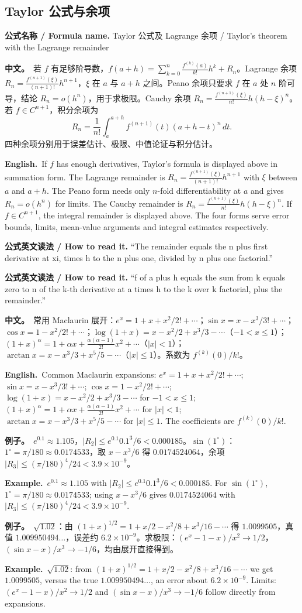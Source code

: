 \documentclass[UTF8,11pt,a4paper]{ctexart}
\newcommand{\BOTH}[2]{\par\noindent\textbf{中文。}\ #1\par\noindent\textbf{English.}\ #2\par}
\newcommand{\EX}[2]{\par\noindent\textbf{例子。}\ #1\par\noindent\textbf{Example.}\ #2\par}
\newcommand{\READ}[1]{\par\noindent\textbf{公式英文读法 / How to read it.} #1\par}
\newcommand{\FORMULA}[2]{\par\noindent\textbf{公式名称 / Formula name.} #1 / #2\par}
\begin{document}
\subsection{Taylor 公式与余项}
\FORMULA{Taylor 公式及 Lagrange 余项}{Taylor's theorem with the Lagrange remainder}
\BOTH{若 $f$ 有足够阶导数，$f(a+h)=\sum_{k=0}^n\frac{f^{(k)}(a)}{k!}h^k+R_n$。Lagrange 余项 $R_n=\frac{f^{(n+1)}(\xi)}{(n+1)!}h^{n+1}$，$\xi$ 在 $a$ 与 $a+h$ 之间。Peano 余项只要求 $f$ 在 $a$ 处 $n$ 阶可导，结论 $R_n=o(h^n)$，用于求极限。Cauchy 余项 $R_n=\frac{f^{(n+1)}(\xi)}{n!}h(h-\xi)^n$。若 $f\in C^{n+1}$，积分余项为
\[
R_n=\frac1{n!}\int_a^{a+h}f^{(n+1)}(t)(a+h-t)^n\,dt.
\]
四种余项分别用于误差估计、极限、中值论证与积分估计。}{If $f$ has enough derivatives, Taylor's formula is displayed above in summation form. The Lagrange remainder is $R_n=\frac{f^{(n+1)}(\xi)}{(n+1)!}h^{n+1}$ with $\xi$ between $a$ and $a+h$. The Peano form needs only $n$-fold differentiability at $a$ and gives $R_n=o(h^n)$ for limits. The Cauchy remainder is $R_n=\frac{f^{(n+1)}(\xi)}{n!}h(h-\xi)^n$. If $f\in C^{n+1}$, the integral remainder is displayed above. The four forms serve error bounds, limits, mean-value arguments and integral estimates respectively.}
\READ{“The remainder equals the n plus first derivative at xi, times h to the n plus one, divided by n plus one factorial.”}
\READ{“f of a plus h equals the sum from k equals zero to n of the k-th derivative at a times h to the k over k factorial, plus the remainder.”}
\BOTH{常用 Maclaurin 展开：$e^x=1+x+x^2/2!+\cdots$；$\sin x=x-x^3/3!+\cdots$；$\cos x=1-x^2/2!+\cdots$；$\log(1+x)=x-x^2/2+x^3/3-\cdots$（$-1<x\le1$）；$(1+x)^\alpha=1+\alpha x+\frac{\alpha(\alpha-1)}{2!}x^2+\cdots$（$|x|<1$）；$\arctan x=x-x^3/3+x^5/5-\cdots$（$|x|\le1$）。系数为 $f^{(k)}(0)/k!$。}{Common Maclaurin expansions: $e^x=1+x+x^2/2!+\cdots$; $\sin x=x-x^3/3!+\cdots$; $\cos x=1-x^2/2!+\cdots$; $\log(1+x)=x-x^2/2+x^3/3-\cdots$ for $-1<x\le1$; $(1+x)^\alpha=1+\alpha x+\frac{\alpha(\alpha-1)}{2!}x^2+\cdots$ for $|x|<1$; $\arctan x=x-x^3/3+x^5/5-\cdots$ for $|x|\le1$. The coefficients are $f^{(k)}(0)/k!$.}
\EX{$e^{0.1}\approx1.105$，$|R_2|\le e^{0.1}0.1^3/6<0.000185$。$\sin(1^\circ)$：$1^\circ=\pi/180\approx0.0174533$，取 $x-x^3/6$ 得 $0.0174524064$，余项 $|R_3|\le(\pi/180)^4/24<3.9\times10^{-9}$。}{$e^{0.1}\approx1.105$ with $|R_2|\le e^{0.1}0.1^3/6<0.000185$. For $\sin(1^\circ)$, $1^\circ=\pi/180\approx0.0174533$; using $x-x^3/6$ gives $0.0174524064$ with $|R_3|\le(\pi/180)^4/24<3.9\times10^{-9}$.}
\EX{$\sqrt{1.02}$：由 $(1+x)^{1/2}=1+x/2-x^2/8+x^3/16-\cdots$ 得 $1.0099505$，真值 $1.009950494\ldots$，误差约 $6.2\times10^{-9}$。求极限：$(e^x-1-x)/x^2\to1/2$，$(\sin x-x)/x^3\to-1/6$，均由展开直接得到。}{$\sqrt{1.02}$: from $(1+x)^{1/2}=1+x/2-x^2/8+x^3/16-\cdots$ we get $1.0099505$, versus the true $1.009950494\ldots$, an error about $6.2\times10^{-9}$. Limits: $(e^x-1-x)/x^2\to1/2$ and $(\sin x-x)/x^3\to-1/6$ follow directly from expansions.}
\end{document}
